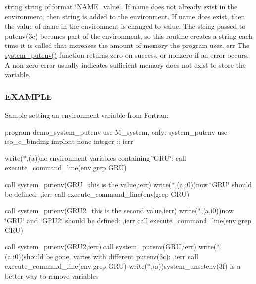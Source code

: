 string string of format \char`\"{}\+N\+A\+M\+E=value\char`\"{}. If name does not already exist in the environment, then string is added to the environment. If name does exist, then the value of name in the environment is changed to value. The string passed to putenv(3c) becomes part of the environment, so this routine creates a string each time it is called that increases the amount of memory the program uses. err The \hyperlink{namespacem__system_af0c9df8e59cac9cd617cd1e20448ea7d}{system\+\_\+putenv()} function returns zero on success, or nonzero if an error occurs. A non-\/zero error usually indicates sufficient memory does not exist to store the variable.

\subsubsection*{E\+X\+A\+M\+P\+LE}

Sample setting an environment variable from Fortran\+:

program demo\+\_\+system\+\_\+putenv use M\+\_\+system, only\+: system\+\_\+putenv use iso\+\_\+c\+\_\+binding implicit none integer \+:\+: ierr

write($\ast$,\textquotesingle{}(a)\textquotesingle{})\textquotesingle{}no environment variables containing \char`\"{}\+G\+R\+U\char`\"{}\+:\textquotesingle{} call execute\+\_\+command\+\_\+line(\textquotesingle{}env$\vert$grep G\+RU\textquotesingle{})

call system\+\_\+putenv(\textquotesingle{}G\+RU=this is the value\textquotesingle{},ierr) write($\ast$,\textquotesingle{}(a,i0)\textquotesingle{})\textquotesingle{}now \char`\"{}\+G\+R\+U\char`\"{} should be defined\+: \textquotesingle{},ierr call execute\+\_\+command\+\_\+line(\textquotesingle{}env$\vert$grep G\+RU\textquotesingle{})

call system\+\_\+putenv(\textquotesingle{}G\+R\+U2=this is the second value\textquotesingle{},ierr) write($\ast$,\textquotesingle{}(a,i0)\textquotesingle{})\textquotesingle{}now \char`\"{}\+G\+R\+U\char`\"{} and \char`\"{}\+G\+R\+U2\char`\"{} should be defined\+: \textquotesingle{},ierr call execute\+\_\+command\+\_\+line(\textquotesingle{}env$\vert$grep G\+RU\textquotesingle{})

call system\+\_\+putenv(\textquotesingle{}G\+R\+U2\textquotesingle{},ierr) call system\+\_\+putenv(\textquotesingle{}G\+RU\textquotesingle{},ierr) write($\ast$,\textquotesingle{}(a,i0)\textquotesingle{})\textquotesingle{}should be gone, varies with different putenv(3c)\+: \textquotesingle{},ierr call execute\+\_\+command\+\_\+line(\textquotesingle{}env$\vert$grep G\+RU\textquotesingle{}) write($\ast$,\textquotesingle{}(a)\textquotesingle{})\textquotesingle{}system\+\_\+unsetenv(3f) is a better way to remove variables\textquotesingle{}

